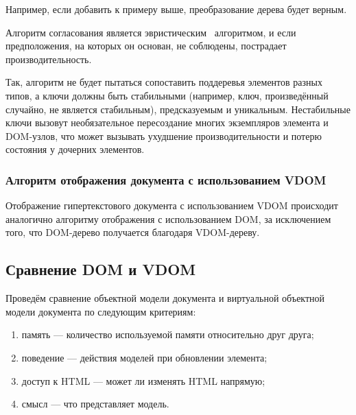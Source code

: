 Например, если добавить  к примеру выше, преобразование дерева будет верным.
\clearpage


Алгоритм согласования является эвристическим~\cite{euristic} алгоритмом, и если предположения, на которых он основан, не соблюдены, пострадает производительность.

Так, алгоритм не будет пытаться сопоставить поддеревья элементов разных типов, а ключи должны быть стабильными (например, ключ, произведённый случайно, не является стабильным), предсказуемым и уникальным.
Нестабильные ключи вызовут необязательное пересоздание многих экземпляров элемента и DOM-узлов, что может вызывать ухудшение производительности и потерю состояния у дочерних элементов.
\clearpage

\subsubsection{Алгоритм отображения документа с использованием VDOM}

Отображение гипертекстового документа с использованием VDOM происходит аналогично алгоритму отображения с использованием DOM, за исключением того, что DOM-дерево получается благодаря VDOM-дереву.

\subsection{Сравнение DOM и VDOM}

Проведём сравнение объектной модели документа и виртуальной объектной модели документа по следующим критериям: 
\begin{enumerate}[label=\arabic*)]
	\item память --- количество используемой памяти относительно друг друга;
	\item поведение --- действия моделей при обновлении элемента;
	\item доступ к HTML --- может ли изменять HTML напрямую;
	\item смысл --- что представляет модель.
\end{enumerate}

